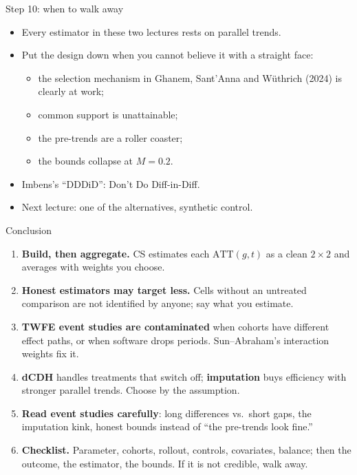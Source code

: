 \documentclass[
  11pt,
  ignorenonframetext,
  aspectratio=169,
]{beamer}
\providecommand{\tightlist}{%
  \setlength{\itemsep}{0pt}\setlength{\parskip}{0pt}}
\begin{document}
\begin{frame}{Step 10: when to walk away}
\protect{}\label{step-10-when-to-walk-away}
\begin{itemize}
\tightlist
\item
  Every estimator in these two lectures rests on parallel trends.
\item
  Put the design down when you cannot believe it with a straight face:

  \begin{itemize}
  \tightlist
  \item
    the selection mechanism in Ghanem, Sant'Anna and Wüthrich (2024) is
    clearly at work;
  \item
    common support is unattainable;
  \item
    the pre-trends are a roller coaster;
  \item
    the bounds collapse at \(M = 0.2\).
  \end{itemize}
\item
  Imbens's ``DDDiD'': Don't Do Diff-in-Diff.
\item
  Next lecture: one of the alternatives, synthetic control.
\end{itemize}
\end{frame}

\begin{frame}{Conclusion}
\protect{}\label{conclusion}
\begin{enumerate}
\tightlist
\item
  \textbf{Build, then aggregate.} CS estimates each \(\text{ATT}(g,t)\)
  as a clean \(2 \times 2\) and averages with weights you choose.
\item
  \textbf{Honest estimators may target less.} Cells without an untreated
  comparison are not identified by anyone; say what you estimate.
\item
  \textbf{TWFE event studies are contaminated} when cohorts have
  different effect paths, or when software drops periods. Sun--Abraham's
  interaction weights fix it.
\item
  \textbf{dCDH} handles treatments that switch off; \textbf{imputation}
  buys efficiency with stronger parallel trends. Choose by the
  assumption.
\item
  \textbf{Read event studies carefully}: long differences vs.~short
  gaps, the imputation kink, honest bounds instead of ``the pre-trends
  look fine.''
\item
  \textbf{Checklist.} Parameter, cohorts, rollout, controls, covariates,
  balance; then the outcome, the estimator, the bounds. If it is not
  credible, walk away.
\end{enumerate}
\end{frame}
\end{document}
